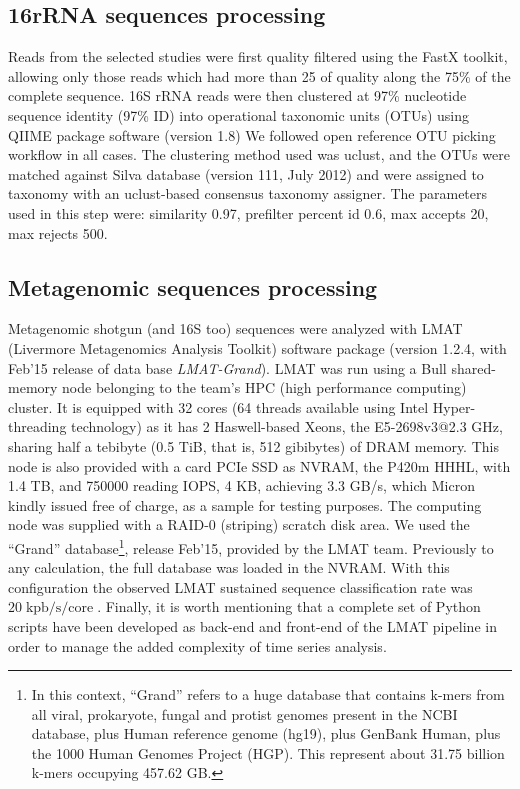 \documentclass[12pt,oneside,letterpaper]{article}
\newcommand{\un}[1]{\operatorname{#1}}
\newcommand{\unclassrate}[0]{\un{kpb/s/core}}
\begin{document}
\subsection{16rRNA sequences processing}
Reads from the selected studies were first quality filtered using the FastX toolkit\cite{FASTX}, allowing only those reads which had more than 25 of quality along the 75\% of the complete sequence. 16S rRNA reads were then clustered at 97\% nucleotide sequence identity (97\% ID) into operational taxonomic units (OTUs) using QIIME package software\cite{QIIME} (version 1.8) We followed open reference OTU picking workflow in all cases. The clustering method used was uclust, and the OTUs were matched against Silva database\cite{SILVA} (version 111, July 2012) and were assigned to taxonomy with an uclust-based consensus taxonomy assigner. The parameters used in this step were: similarity 0.97, prefilter percent id 0.6, max accepts 20, max rejects 500. 

\subsection{Metagenomic sequences processing}
Metagenomic shotgun (and 16S too) sequences were analyzed with LMAT (Livermore Metagenomics Analysis Toolkit) software package\cite{LMAT} (version 1.2.4, with Feb'15 release of data base \emph{LMAT-Grand}). LMAT was run using a Bull shared-memory node belonging to the team's HPC (high performance computing) cluster. It is equipped with 32 cores (64 threads available using Intel Hyper-threading technology) as it has 2 Haswell-based Xeons, the E5-2698v3@2.3 GHz, sharing half a tebibyte (0.5 TiB, that is, 512 gibibytes) of DRAM memory. This node is also provided with a card PCIe SSD as NVRAM, the P420m HHHL, with 1.4 TB, and 750000 reading IOPS, 4 KB, achieving 3.3 GB/s, which Micron kindly issued free of charge, as a sample for testing purposes. The computing node was supplied with a RAID-0 (striping) scratch disk area. We used the ``Grand'' database\footnote{In this context, ``Grand'' refers to a huge database that contains k-mers from all viral, prokaryote, fungal and protist genomes present in the NCBI database, plus Human reference genome (hg19), plus GenBank Human, plus the 1000 Human Genomes Project (HGP). This represent about 31.75 billion k-mers occupying 457.62 GB.}, release Feb'15, provided by the LMAT team. Previously to any calculation, the full database was loaded in the NVRAM. With this configuration the observed LMAT sustained sequence classification rate was $20\unclassrate$. Finally, it is worth mentioning that a complete set of Python scripts have been developed as back-end and front-end of the LMAT pipeline in order to manage the added complexity of time series analysis. 
\end{document}
